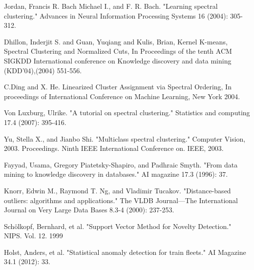 \begin{thebibliography}{9}
Jordan, Francis R. Bach Michael I., and F. R. Bach. "Learning spectral clustering." Advances in Neural Information Processing Systems 16 (2004): 305-312.

Dhillon, Inderjit S. and Guan, Yuqiang and Kulis, Brian, Kernel K-means, Spectral Clustering and Normalized Cuts, In Proceedings of the tenth ACM SIGKDD International conference on Knowledge discovery and data mining (KDD’04),(2004) 551-556.

C.Ding and X. He. Linearized Cluster Assignment via Spectral Ordering, In proceedings of International Conference on Machine Learning, New York 2004.

Von Luxburg, Ulrike. "A tutorial on spectral clustering." Statistics and computing 17.4 (2007): 395-416.

Yu, Stella X., and Jianbo Shi. "Multiclass spectral clustering." Computer Vision, 2003. Proceedings. Ninth IEEE International Conference on. IEEE, 2003.

Fayyad, Usama, Gregory Piatetsky-Shapiro, and Padhraic Smyth. "From data mining to knowledge discovery in databases." AI magazine 17.3 (1996): 37.

Knorr, Edwin M., Raymond T. Ng, and Vladimir Tucakov. "Distance-based outliers: algorithms and applications." The VLDB Journal—The International Journal on Very Large Data Bases 8.3-4 (2000): 237-253.

Schölkopf, Bernhard, et al. "Support Vector Method for Novelty Detection." NIPS. Vol. 12. 1999

Holst, Anders, et al. "Statistical anomaly detection for train fleets." AI Magazine 34.1 (2012): 33.


\end{thebibliography}
